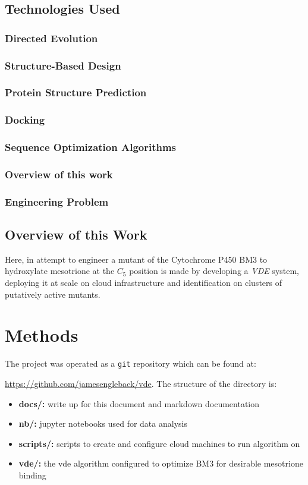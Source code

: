 \documentclass[16pt]{book}
\begin{document}
\subsection{Technologies Used}
\subsubsection{Directed Evolution}
\subsubsection{Structure-Based Design}
\subsubsection{Protein Structure Prediction}
\subsubsection{Docking}
\subsubsection{Sequence Optimization Algorithms}
\subsubsection{Overview of this work}
\subsubsection{Engineering Problem}
\subsection{Overview of this Work}

Here, in attempt to engineer a mutant of the Cytochrome P450 BM3 to hydroxylate mesotrione at the $C_5$ position is made by developing a \textit{VDE} system, deploying it at scale on cloud infrastructure and identification on clusters of putatively active mutants.
\section{Methods}

The project was operated as a  \texttt{git} repository which can be found at:

\href{https://github.com/jamesengleback/vde}{https://github.com/jamesengleback/vde}.
The structure of the directory is:

\begin{itemize}
	\item \textbf{docs/:} write up for this document and markdown documentation
	\item \textbf{nb/:} jupyter notebooks used for data analysis
	\item \textbf{scripts/:} scripts to create and configure cloud machines to run algorithm on
	\item \textbf{vde/:} the vde algorithm configured to optimize BM3 for desirable mesotrione binding
\end{itemize}
\end{document}
